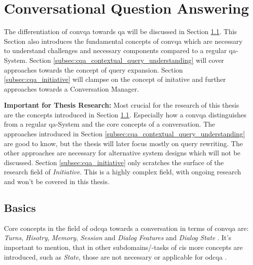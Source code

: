 
\section{Conversational Question Answering}
\label{sec:cqa}

The differentiation of \gls{convqa} towards \gls{qa} will be discussed in Section \ref{subsec:cqa_basics}. This Section also introduces the fundamental concepts of \gls{convqa} which are necessary to understand challenges and necessary components compared to a regular \gls{qa}-System. Section \ref{subsec:cqa_contextual_query_understanding} will cover approaches towards the concept of query expansion. Section \ref{subsec:cqa_initiative} will clampse on the concept of initative and further approaches towards a Conversation Manager.

\textbf{Important for Thesis Research:} Most crucial for the research of this thesis are the concepts introduced in Section \ref{subsec:cqa_basics}. Especially how a \gls{convqa} distinguishes from a regular \gls{qa}-System and the core concepts of a conversation. The approaches introduced in Section \ref{subsec:cqa_contextual_query_understanding} are good to know, but the thesis will later focus mostly on query rewriting. The other approaches are necessary for alternative system designs which will not be discussed. Section \ref{subsec:cqa_initiative} only scratches the surface of the research field of \textit{Initiative}. This is a highly complex field, with ongoing research and won't be covered in this thesis.

\subsection{Basics}
\label{subsec:cqa_basics}

Core concepts in the field of \gls{odcqa} towards a conversation in terms of \gls{convqa} are: \textit{Turns}, \textit{Hisotry}, \textit{Memory}, \textit{Session} and \textit{Dialog Features} and \textit{Dialog State} \cite{zamani_conversational_2023}. It's important to mention, that in other subdomains/-tasks of \gls{cis} more concepts are introduced, such as \textit{State}, those are not necessary or applicable for \gls{odcqa} \cite{zaib_conversational_2021}.

